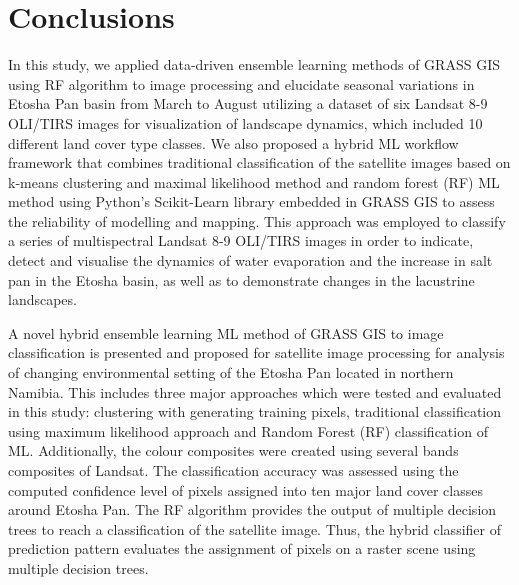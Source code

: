 \documentclass[draft]{agujournal2019}
\begin{document}
\section{Conclusions}

In this study, we applied data-driven ensemble learning methods of GRASS GIS using RF algorithm to image processing and elucidate seasonal variations in Etosha Pan basin from March to August utilizing a dataset of six Landsat 8-9 OLI/TIRS images for visualization of landscape dynamics, which included 10 different land cover type classes. We also proposed a hybrid ML workflow framework that combines traditional classification of the satellite images based on k-means clustering and maximal likelihood method and random forest (RF) ML method using Python's Scikit-Learn library embedded in GRASS GIS to assess the reliability of modelling and mapping. This approach was employed to classify a series of multispectral Landsat 8-9 OLI/TIRS images in order to indicate, detect and visualise the dynamics of water evaporation and the increase in salt pan in the Etosha basin, as well as to demonstrate changes in the lacustrine landscapes. 

A novel hybrid ensemble learning ML method of GRASS GIS to image classification is presented and proposed for satellite image processing for analysis of changing environmental setting of the Etosha Pan located in northern Namibia. This includes three major approaches which were tested and evaluated in this study: clustering with generating training pixels, traditional classification using maximum likelihood approach and Random Forest (RF) classification of ML. Additionally, the colour composites were created using several bands composites of Landsat. The classification accuracy was assessed using the computed confidence level of pixels assigned into ten major land cover classes around Etosha Pan. The RF algorithm provides the output of multiple decision trees to reach a classification of the satellite image. Thus, the hybrid classifier of prediction pattern evaluates the assignment of pixels on a raster scene using multiple decision trees.
\end{document}
